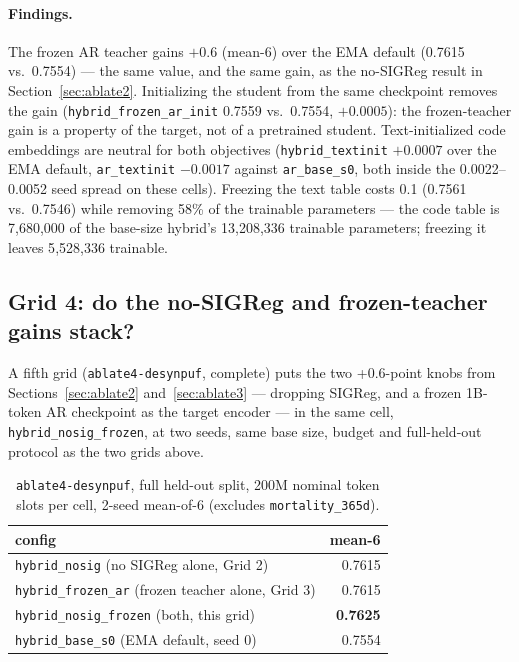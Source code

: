 \documentclass[11pt,a4paper]{article}
\newcommand{\code}[1]{\texttt{\small #1}}
\newcommand{\best}[1]{\textbf{#1}}
\begin{document}
\paragraph{Findings.} The frozen AR teacher gains $+0.6$ (mean-6) over the
EMA default (0.7615 vs.\ 0.7554) --- the same value, and the same gain, as
the no-SIGReg result in Section~\ref{sec:ablate2}. Initializing the student
from the same checkpoint removes the gain (\code{hybrid\_frozen\_ar\_init}
0.7559 vs.\ 0.7554, $+0.0005$): the frozen-teacher gain is a property of the
target, not of a pretrained student. Text-initialized code embeddings are
neutral for both objectives (\code{hybrid\_textinit} $+0.0007$ over the EMA
default, \code{ar\_textinit} $-0.0017$ against \code{ar\_base\_s0}, both
inside the 0.0022--0.0052 seed spread on these cells). Freezing the text
table costs 0.1 (0.7561 vs.\ 0.7546) while removing 58\% of the trainable
parameters --- the code table is 7{,}680{,}000 of the base-size hybrid's
13{,}208{,}336 trainable parameters; freezing it leaves 5{,}528{,}336
trainable.

\subsection{Grid 4: do the no-SIGReg and frozen-teacher gains stack?}
\label{sec:ablate4}

A fifth grid (\code{ablate4-desynpuf}, complete) puts the two +0.6-point
knobs from Sections~\ref{sec:ablate2} and~\ref{sec:ablate3} --- dropping
SIGReg, and a frozen 1B-token AR checkpoint as the target encoder --- in the
same cell, \code{hybrid\_nosig\_frozen}, at two seeds, same base size, budget
and full-held-out protocol as the two grids above.

\begin{table}[h]
\centering\small
\caption{\code{ablate4-desynpuf}, full held-out split, 200M nominal token
slots per cell, 2-seed mean-of-6 (excludes \code{mortality\_365d}).}
\label{tab:ablate4}
\begin{tabular}{lr}
\toprule
config & mean-6 \\
\midrule
\code{hybrid\_nosig} (no SIGReg alone, Grid 2) & 0.7615 \\
\code{hybrid\_frozen\_ar} (frozen teacher alone, Grid 3) & 0.7615 \\
\code{hybrid\_nosig\_frozen} (both, this grid) & \best{0.7625} \\
\code{hybrid\_base\_s0} (EMA default, seed 0) & 0.7554 \\
\bottomrule
\end{tabular}
\end{table}
\end{document}

